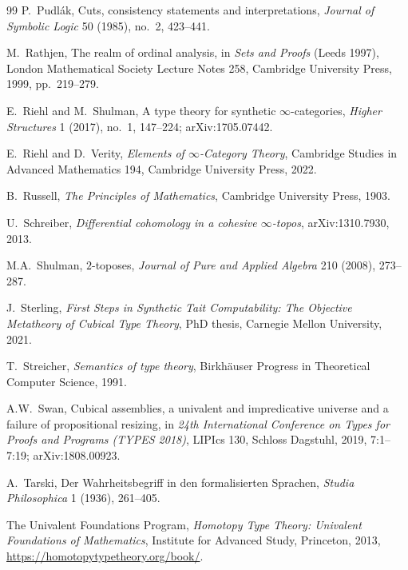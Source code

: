 \documentclass[11pt]{article}
\theoremstyle{plain}
\theoremstyle{definition}
\begin{document}
\begin{thebibliography}{99}
P.~Pudl\'ak,
\newblock Cuts, consistency statements and interpretations,
\newblock \emph{Journal of Symbolic Logic} 50 (1985), no.~2, 423--441.

M.~Rathjen,
\newblock The realm of ordinal analysis,
\newblock in \emph{Sets and Proofs} (Leeds 1997), London Mathematical Society Lecture Notes 258, Cambridge University Press, 1999, pp.~219--279.

E.~Riehl and M.~Shulman,
\newblock A type theory for synthetic $\infty$-categories,
\newblock \emph{Higher Structures} 1 (2017), no.~1, 147--224; arXiv:1705.07442.

E.~Riehl and D.~Verity,
\newblock \emph{Elements of $\infty$-Category Theory},
\newblock Cambridge Studies in Advanced Mathematics 194, Cambridge University Press, 2022.

B.~Russell,
\newblock \emph{The Principles of Mathematics},
\newblock Cambridge University Press, 1903.

U.~Schreiber,
\newblock \emph{Differential cohomology in a cohesive $\infty$-topos},
\newblock arXiv:1310.7930, 2013.

M.A.~Shulman,
\newblock $2$-toposes,
\newblock \emph{Journal of Pure and Applied Algebra} 210 (2008), 273--287.

J.~Sterling,
\newblock \emph{First Steps in Synthetic Tait Computability: The Objective Metatheory of Cubical Type Theory},
\newblock PhD thesis, Carnegie Mellon University, 2021.

T.~Streicher,
\newblock \emph{Semantics of type theory},
\newblock Birkh\"auser Progress in Theoretical Computer Science, 1991.

A.W.~Swan,
\newblock Cubical assemblies, a univalent and impredicative universe and a failure of propositional resizing,
\newblock in \emph{24th International Conference on Types for Proofs and Programs (TYPES 2018)}, LIPIcs 130, Schloss Dagstuhl, 2019, 7:1--7:19; arXiv:1808.00923.

A.~Tarski,
\newblock Der Wahrheitsbegriff in den formalisierten Sprachen,
\newblock \emph{Studia Philosophica} 1 (1936), 261--405.

The Univalent Foundations Program,
\newblock \emph{Homotopy Type Theory: Univalent Foundations of Mathematics},
\newblock Institute for Advanced Study, Princeton, 2013,
\newblock \url{https://homotopytypetheory.org/book/}.


\end{thebibliography}
\end{document}
